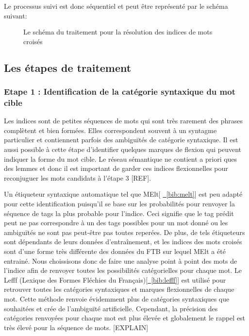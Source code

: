 \documentclass[a4paper, 12pt]{article}
\begin{document}
Le processus suivi est donc séquentiel et peut être représenté par le schéma 
suivant:

\begin{figure}[!ht]
\centering
\def\svgwidth{\columnwidth}

\caption{Le schéma du traitement pour la résolution des indices de mots croisés}
\label{fig:schema_crosswords}
\end{figure}

\subsection{Les étapes de traitement}
\subsubsection{Etape 1 : Identification de la catégorie syntaxique du mot cible}
Les indices sont de petites séquences de mots qui sont très rarement des phrases 
complètent et bien formées. Elles correspondent souvent à un syntagme 
particulier et contiennent parfois des ambiguïtés de catégorie syntaxique. Il 
est aussi possible à cette étape d'identifier quelques marques de flexion qui 
peuvent indiquer la forme du mot cible. Le réseau sémantique ne contient a 
priori ques des lemmes et donc il est important de garder ces indices 
flexionnelles pour reconjuguer les mots candidats à l'étape 3 [REF].  

Un étiqueteur syntaxique automatique tel que MElt[ 
\hyperref[bib:melt]{~\ref*{bib:melt}}] est peu adapté pour cette identification 
puisqu'il se base sur les probabilités pour renvoyer la séquence de tags la plus 
probable pour l'indice. Ceci signifie que le tag prédit peut ne pas correspondre 
à un des tags possibles pour un mot donné ou les ambiguïtés ne sont pas 
peut-être pas toutes reperées. De plus, de tels étiqueteurs sont dépendants de 
leurs données d'entraînement, et les indices des mots croisés sont d'une forme 
très différente des données du FTB sur lequel MElt a été entrainé. Nous 
choissisons donc de faire une analyse point à point des mots de l'indice afin de 
renvoyer toutes les possibilités catégorielles pour chaque mot. Le Lefff 
(Lexique des Formes Fléchies du 
Français)[\hyperref[bib:lefff]{~\ref*{bib:lefff}}] est utilisé pour retrouver 
toutes les catégories syntaxiques et marques flexionnelles de chaque mot. Cette 
méthode renvoie évidemment plus de catégories syntaxiques que souhaitées et crée 
de l'ambiguïté artificielle. Cependant, la précision des catégories renvoyées 
pour chaque mot est plus élevée et globalement le rappel est très élevé pour la 
séquence de mots. [EXPLAIN]
\end{document}
